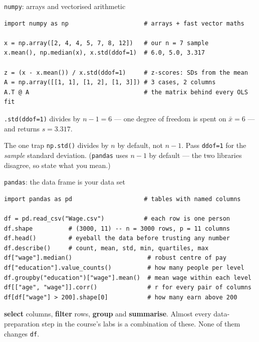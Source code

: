 \documentclass[aspectratio=169,11pt]{beamer}
\begin{document}
\begin{frame}[fragile]{\texttt{numpy}: arrays and vectorised arithmetic}
\begin{lstlisting}
import numpy as np                     # arrays + fast vector maths

x = np.array([2, 4, 4, 5, 7, 8, 12])   # our n = 7 sample
x.mean(), np.median(x), x.std(ddof=1)  # 6.0, 5.0, 3.317

z = (x - x.mean()) / x.std(ddof=1)     # z-scores: SDs from the mean
A = np.array([[1, 1], [1, 2], [1, 3]]) # 3 cases, 2 columns
A.T @ A                                # the matrix behind every OLS fit
\end{lstlisting}
  \begin{readme}
    \footnotesize \texttt{.std(ddof=1)} divides by $n-1 = 6$ --- one degree of
    freedom is spent on $\bar x = 6$ --- and returns $s = 3.317$.
  \end{readme}
  \begin{alertblock}{The one trap}
    \texttt{np.std()} divides by $n$ by default, not $n-1$. Pass
    \texttt{ddof=1} for the \emph{sample} standard deviation. (\texttt{pandas}
    uses $n-1$ by default --- the two libraries disagree, so state what you
    mean.)
  \end{alertblock}
\end{frame}

\begin{frame}[fragile]{\texttt{pandas}: the data frame is your data set}
\begin{lstlisting}
import pandas as pd                    # tables with named columns

df = pd.read_csv("Wage.csv")           # each row is one person
df.shape          # (3000, 11) -- n = 3000 rows, p = 11 columns
df.head()         # eyeball the data before trusting any number
df.describe()     # count, mean, std, min, quartiles, max
df["wage"].median()                     # robust centre of pay
df["education"].value_counts()          # how many people per level
df.groupby("education")["wage"].mean()  # mean wage within each level
df[["age", "wage"]].corr()              # r for every pair of columns
df[df["wage"] > 200].shape[0]           # how many earn above 200
\end{lstlisting}
  \begin{takeaway}
    \textbf{select} columns, \textbf{filter} rows, \textbf{group} and
    \textbf{summarise}. Almost every data-preparation step in the course's
    labs is a combination of these. None of them changes \texttt{df}.
  \end{takeaway}
\end{frame}
\end{document}
